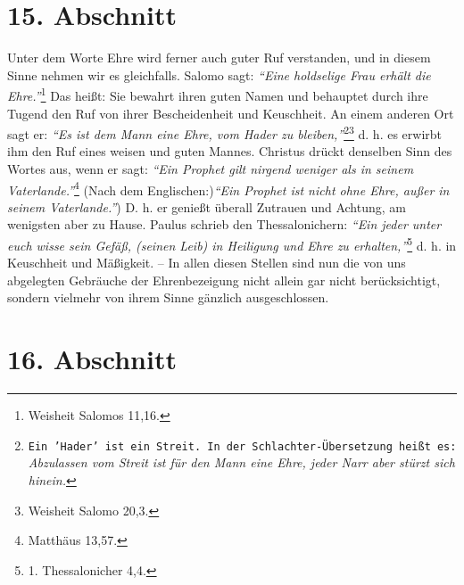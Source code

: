 \section{15. Abschnitt} \label{kap9_ab15}

Unter dem Worte Ehre wird ferner auch guter Ruf verstanden, und in diesem Sinne
nehmen wir es gleichfalls. Salomo sagt:
\textit{"`Eine holdselige Frau erhält die Ehre."'}\footnote{Weisheit Salomos
11,16.}
Das heißt: Sie bewahrt ihren guten Namen und
behauptet durch ihre Tugend den Ruf von ihrer Bescheidenheit und Keuschheit. An
einem anderen Ort sagt er:
\textit{"`Es ist dem Mann eine Ehre, vom Hader zu
bleiben,"'}\footnote{\texttt{Ein 'Hader' ist ein Streit. In der
Schlachter-Übersetzung heißt es:} \textit{Abzulassen vom Streit ist für den
Mann eine Ehre, jeder Narr aber stürzt sich hinein.}}\footnote{Weisheit Salomo
20,3.}
d. h. es erwirbt ihm den Ruf eines weisen und
guten Mannes. Christus drückt denselben Sinn des Wortes aus, wenn er sagt:
\textit{"`Ein Prophet gilt nirgend weniger als in seinem
Vaterlande."'}\footnote{Matthäus 13,57.}
(Nach dem Englischen:)\textit{"`Ein Prophet ist nicht ohne Ehre, außer in seinem
Vaterlande."'}) D. h. er genießt überall Zutrauen und Achtung, am wenigsten aber
zu
Hause. Paulus schrieb den Thessalonichern:
\textit{"`Ein jeder unter euch wisse sein
Gefäß, (seinen Leib) in Heiligung und Ehre zu erhalten,"'}\footnote{1.
Thessalonicher 4,4.}
d. h. in Keuschheit und Mäßigkeit. -- In allen diesen Stellen sind nun die
von uns abgelegten Gebräuche der Ehrenbezeigung nicht allein gar nicht
berücksichtigt, sondern vielmehr von ihrem Sinne gänzlich ausgeschlossen.

\section{16. Abschnitt} \label{kap9_ab16}

